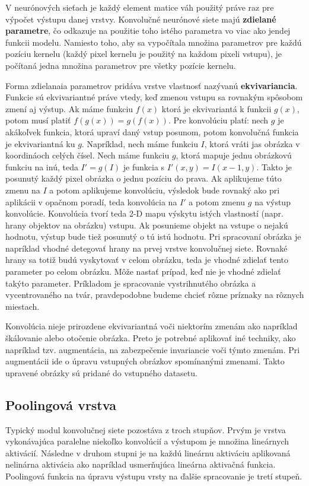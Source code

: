 V neurónových sieťach je každý element matice váh použitý práve raz pre výpočet výstupu danej vrstvy. Konvolučné neurónové siete majú {\bf zdielané parametre}, čo odkazuje na použitie toho istého parametra vo viac ako jendej funkcii modelu. Namiesto toho, aby sa vypočítala množina parametrov pre každú pozíciu kernelu (každý pixel kernelu je použitý na každom pixeli vstupu), je počítaná jedna množina parametrov pre všetky pozície kernelu.

Forma zdielanaia parametrov pridáva vrstve vlastnosť nazývanú {\bf ekvivariancia}. Funkcie sú ekvivariantné práve vtedy, keď zmenou vstupu sa rovnakým spôsobom zmení aj výstup. Ak máme funkciu $f(x)$ ktorá je ekvivariantá k funkcii $g(x)$, potom musí platiť $f(g(x)) = g(f(x))$. Pre konvolúciu platí: nech $g$ je akákoľvek funkcia, ktorá upraví daný vstup posunom, potom konvolučná funkcia je ekvivariantná ku $g$. Napríklad, nech máme funkciu $I$, ktorá vráti jas obrázka v koordináoch celých čísel. Nech máme funkciu $g$, ktorá mapuje jednu obrázkovú funkciu na inú, teda $I' = g(I)$ je funkcia s $I'(x,y) = I(x - 1, y)$. Takto je posunutý každý pixel obrázka o jednu pozíciu do prava. Ak aplikujeme túto zmenu na $I$ a potom aplikujeme konvolúciu, výsledok bude rovnaký ako pri aplikácii v opačnom poradí, teda konvolúcia na $I'$ a potom zmenu $g$ na výstup konvolúcie. Konvolúcia tvorí teda 2-D mapu výskytu istých vlastností (napr. hrany objektov na obrázku) vstupu. Ak posunieme objekt na vstupe o nejakú hodnotu, výstup bude tiež posunutý o tú istú hodnotu. Pri spracovaní obrázka je napríklad vhodné detegovať hrany na prvej vrstve konvolučnej siete. Rovnaké hrany sa totiž budú vyskytovať v celom obrázku, teda je vhodné zdielať tento parameter po celom obrázku. Môže nastať prípad, keď nie je vhodné zdielať takýto parameter. Príkladom je spracovanie vystrihnutého obrázka a vycentrovaného na tvár, pravdepodobne budeme chcieť rôzne príznaky na rôznych miestach.

Konvolúcia nieje prirozdene ekvivariantná voči niektorím zmenám ako napríklad škálovanie alebo otočenie obrázka. Preto je potrebné aplikovať iné techniky, ako napríklad tzv. augmentácia, na zabezpečenie invariancie voči týmto zmenám. Pri augmentácii ide o úpravu vstupných obrázkov spomínanými zmenami. Takto upravené obrázky sú pridané do vstupného datasetu.

  \subsection{Poolingová vrstva}
Typický modul konvolučnej siete pozostáva z troch stupňov. Prvým je vrstva vykonávajúca paralelne niekoľko konvolúcií a výstupom je množina lineárnych aktivácií. Následne v druhom stupni je na každú lineárnu aktiváciu aplikovaná nelinárna aktivácia ako napríklad usmerňujúca lineárna aktivačná funkcia. Poolingová funkcia na úpravu výstupu vrsty na ďalšie spracovanie je tretí stupeň. 

